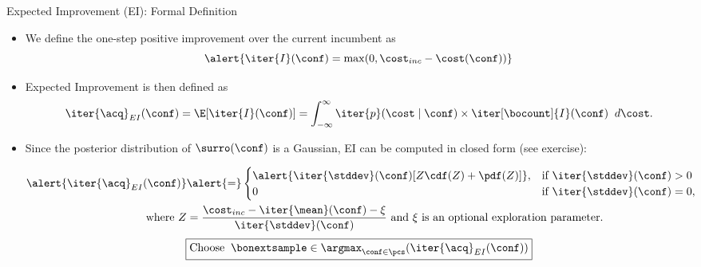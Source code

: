 \begin{frame}[c]{Expected Improvement (EI): Formal Definition}
    \begin{itemize}\abovedisplayskip=0em\belowdisplayskip=-0.75em
        \item We define the one-step positive \alert{improvement over the current incumbent} as
        \smallskip
        \[
            \alert{\iter{I}(\conf) = \max(0, \cost_{inc} - \cost(\conf))}
        \]
        \smallskip
        \item Expected Improvement is then defined as \alert{\[\iter{\acq}_{EI}(\conf) = \E[\iter{I}(\conf)] = \int_{-\infty}^{\infty} \iter{p}(\cost \mid \conf) \times \iter[\bocount]{I}(\conf)\;\; d\cost.\]}
        \pause
        \smallskip
        \item Since the posterior distribution of $\surro(\conf)$ is a Gaussian, EI can be computed in closed form (see exercise):
        
        \begin{align*}
            \alert{\iter{\acq}_{EI}(\conf)} &\alert{=} 
            \begin{cases}
                \alert{\iter{\stddev}(\conf)[Z\cdf(Z) + \pdf(Z)]}, & \text{if }\iter{\stddev}(\conf) > 0 \\
                0 & \text{if }\iter{\stddev}(\conf) = 0,
            \end{cases}\\
            \text{where }Z &=\dfrac{\cost_{inc} - \iter{\mean}(\conf) - \xi}{\iter{\stddev}(\conf)}
            \text{ and } \xi \text{ is an optional exploration parameter.}
        \end{align*}
    \pause
    \bigskip
    \[\boxed{\text{Choose}\;\;\bonextsample \in \argmax_{\conf\in\pcs}(\iter{\acq}_{EI}(\conf))}
    \]
    \end{itemize}
\end{frame}
